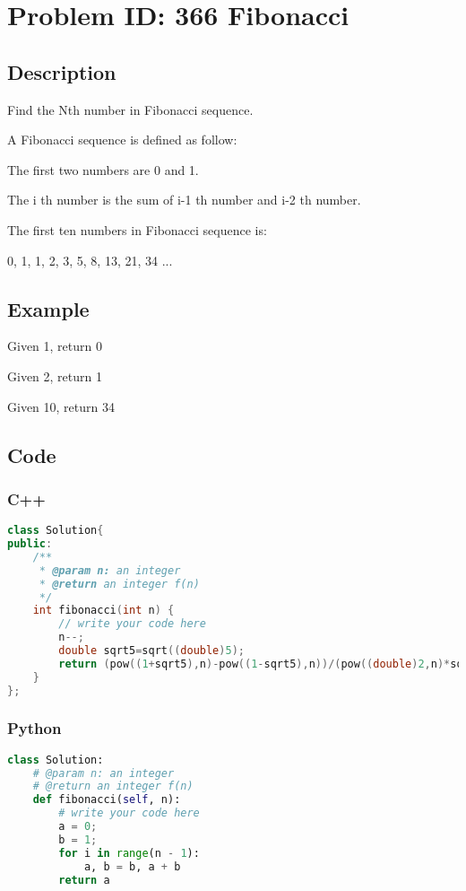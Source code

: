 \section{Problem ID: 366 Fibonacci}
\subsection{Description}
Find the Nth number in Fibonacci sequence.

A Fibonacci sequence is defined as follow:

The first two numbers are 0 and 1.

The i th number is the sum of i-1 th number and i-2 th number.

The first ten numbers in Fibonacci sequence is:

0, 1, 1, 2, 3, 5, 8, 13, 21, 34 ...

\subsection{Example}
Given 1, return 0

Given 2, return 1

Given 10, return 34

\subsection{Code}
\scriptsize
\subsubsection{C++}
\begin{lstlisting}[language=C++]
class Solution{
public:
    /**
     * @param n: an integer
     * @return an integer f(n)
     */
    int fibonacci(int n) {
        // write your code here
        n--;
        double sqrt5=sqrt((double)5);
        return (pow((1+sqrt5),n)-pow((1-sqrt5),n))/(pow((double)2,n)*sqrt5);
    }
};
\end{lstlisting}

\subsubsection{Python}
\begin{lstlisting}[language=Python]
class Solution:
    # @param n: an integer
    # @return an integer f(n)
    def fibonacci(self, n):
        # write your code here
        a = 0;
        b = 1;
        for i in range(n - 1):
            a, b = b, a + b
        return a
\end{lstlisting}
\normalsize 